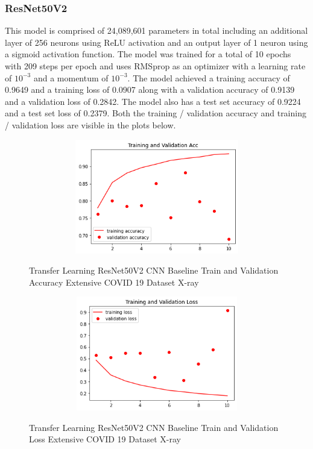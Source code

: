 \subsubsection{ResNet50V2}
This model is comprised of 24,089,601 parameters in total including an additional layer of 256 neurons using ReLU activation and an output layer of 1 neuron using a sigmoid activation function.  The model was trained for a total of 10 epochs with 209 steps per epoch and uses RMSprop as an optimizer with a learning rate of $10^{-3}$ and a momentum of $10^{-3}$.  The model achieved a training accuracy of 0.9649 and a training loss of 0.0907 along with a validation accuracy of 0.9139 and a validation loss of 0.2842.  The model also has a test set accuracy of 0.9224 and a test set loss of 0.2379. Both the training / validation accuracy and training / validation loss are visible in the plots below.
 \begin{figure}[H]
    \centering
    \includegraphics[width=1\textwidth,height=5cm,keepaspectratio]{Images/ResNet50V2BaselineTrainingValidationAccuracyExtensiveXray.png}\\
    \caption{Transfer Learning ResNet50V2 CNN Baseline Train and Validation Accuracy Extensive COVID 19 Dataset X-ray}
    \label{fig:ResNet50V2 CNN Baseline Train and Validation Accuracy Extensive COVID 19 Dataset X-ray}
\end{figure}
 \begin{figure}[H]
    \centering   \includegraphics[width=1\textwidth,height=5cm,keepaspectratio]{Images/ResNet50V2BaselineTrainingValidationLossExtensiveXray.png}\\
    \caption{Transfer Learning ResNet50V2 CNN Baseline Train and Validation Loss Extensive COVID 19 Dataset X-ray}
    \label{fig:ResNet50V2 CNN Baseline Train and Validation Loss Extensive COVID 19 Dataset X-ray}
\end{figure}
